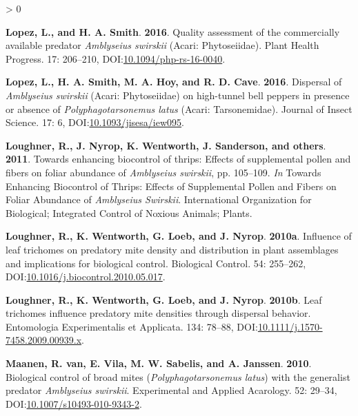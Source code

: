 \documentclass{ufdissertation}[overrideChapters] %
\newlength{\cslhangindent}
\newenvironment{CSLReferences}[2] %
 {%
  \setlength{\parindent}{0pt}
  \ifodd #1 \everypar{\setlength{\hangindent}{\cslhangindent}}\ignorespaces\fi
  \ifnum #2 > 0
  \setlength{\parskip}{#2\baselineskip}
  \fi
 }%
 {}
\begin{document}
{\begin{CSLReferences}{1}{1}
\leavevmode{}%
\textbf{Lopez, L., and H. A. Smith}. \textbf{2016}. Quality assessment of the commercially available predator {\emph{Amblyseius swirskii}} ({Acari}: {Phytoseiidae}). Plant Health Progress. 17: 206--210, DOI:\href{https://doi.org/10.1094/php-rs-16-0040}{10.1094/php-rs-16-0040}.

\leavevmode{}%
\textbf{Lopez, L., H. A. Smith, M. A. Hoy, and R. D. Cave}. \textbf{2016}. Dispersal of {\emph{Amblyseius swirskii}} ({Acari}: {Phytoseiidae}) on high-tunnel bell peppers in presence or absence of {\emph{Polyphagotarsonemus latus}} ({Acari}: {Tarsonemidae}). Journal of Insect Science. 17: 6, DOI:\href{https://doi.org/10.1093/jisesa/iew095}{10.1093/jisesa/iew095}.

\leavevmode{}%
\textbf{Loughner, R., J. Nyrop, K. Wentworth, J. Sanderson, and others}. \textbf{2011}. Towards enhancing biocontrol of thrips: Effects of supplemental pollen and fibers on foliar abundance of {\emph{Amblyseius swirskii}}, pp. 105--109. \emph{In} Towards Enhancing Biocontrol of Thrips: Effects of Supplemental Pollen and Fibers on Foliar Abundance of {\emph{Amblyseius Swirskii}}. International Organization for Biological; Integrated Control of Noxious Animals; Plants.

\leavevmode{}%
\textbf{Loughner, R., K. Wentworth, G. Loeb, and J. Nyrop}. \textbf{2010a}. Influence of leaf trichomes on predatory mite density and distribution in plant assemblages and implications for biological control. Biological Control. 54: 255--262, DOI:\href{https://doi.org/10.1016/j.biocontrol.2010.05.017}{10.1016/j.biocontrol.2010.05.017}.

\leavevmode{}%
\textbf{Loughner, R., K. Wentworth, G. Loeb, and J. Nyrop}. \textbf{2010b}. Leaf trichomes influence predatory mite densities through dispersal behavior. Entomologia Experimentalis et Applicata. 134: 78--88, DOI:\href{https://doi.org/10.1111/j.1570-7458.2009.00939.x}{10.1111/j.1570-7458.2009.00939.x}.

\leavevmode{}%
\textbf{Maanen, R. van, E. Vila, M. W. Sabelis, and A. Janssen}. \textbf{2010}. Biological control of broad mites ({\emph{Polyphagotarsonemus latus}}) with the generalist predator {\emph{Amblyseius swirskii}}. Experimental and Applied Acarology. 52: 29--34, DOI:\href{https://doi.org/10.1007/s10493-010-9343-2}{10.1007/s10493-010-9343-2}.


\end{CSLReferences}}
\end{document}

